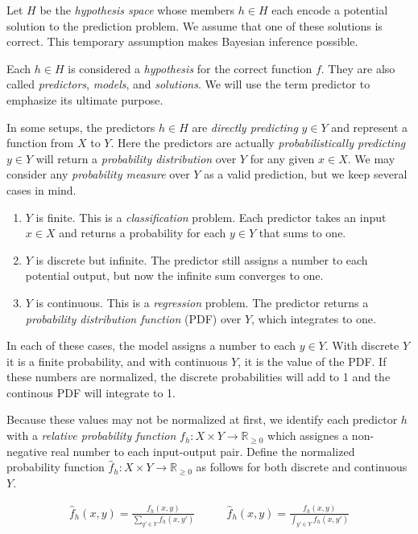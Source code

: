 \documentclass[twoside]{article}
\begin{document}
Let \(H\) be the \textit{hypothesis space} whose members \(h \in H\) each encode a potential solution to the prediction problem. We assume that one of these solutions is correct. This temporary assumption makes Bayesian inference possible.

Each \(h \in H\) is considered a \textit{hypothesis} for the correct function \(f\). They are also called \textit{predictors}, \textit{models}, and \textit{solutions}. We will use the term predictor to emphasize its ultimate purpose.

In some setups, the predictors \(h \in H\) are \textit{directly predicting} \(y \in Y\) and represent a function from \(X\) to \(Y\). Here the predictors are actually \textit{probabilistically predicting} \(y \in Y\) will return a \textit{probability distribution} over \(Y\) for any given \(x \in X\). We may consider any \textit{probability measure} over \(Y\) as a valid prediction, but we keep several cases in mind.

\begin{enumerate}
	\item \(Y\) is finite. This is a \textit{classification} problem. Each predictor takes an input \(x \in X\) and returns a probability for each \(y \in Y\) that sums to one.
	\item \(Y\) is discrete but infinite. The predictor still assigns a number to each potential output, but now the infinite sum converges to one.
	\item \(Y\) is continuous. This is a \textit{regression} problem. The predictor returns a \textit{probability distribution function} (PDF) over \(Y\), which integrates to one.
\end{enumerate}

In each of these cases, the model assigns a number to each \(y \in Y\). With discrete \(Y\) it is a finite probability, and with continuous \(Y\), it is the value of the PDF. If these numbers are normalized, the discrete probabilities will add to 1 and the continous PDF will integrate to 1.

Because these values may not be normalized at first, we identify each predictor \(h\) with a \textit{relative probability function} \(f_h: X \times Y \rightarrow \mathbb{R}_{\geq 0}\) which assignes a non-negative real number to each input-output pair. Define the normalized probability function \(\hat{f}_h: X \times Y \rightarrow \mathbb{R}_{\geq 0}\) as follows for both discrete and continuous \(Y\).

\begin{align}
\label{eq:normalized_probability_model}
\hat{f}_h(x, y)=\frac{f_h(x, y)}{\sum_{y' \in Y} f_h(x,y')} &
\qquad\hat{f}_h(x, y)=\frac{f_h(x, y)}{\int_{y' \in Y} f_h(x,y')}
\end{align}
\end{document}
